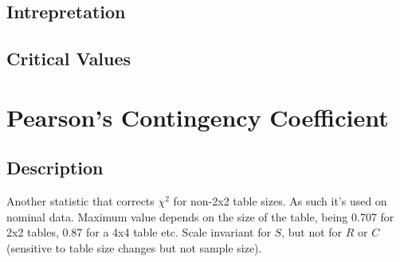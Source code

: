\documentclass[11pt]{article}
\begin{document}
\subsection{Intrepretation}

\subsection{Critical Values}















\section{Pearson's Contingency Coefficient}
\label{section:contingencycoefficient}
\subsection{Description}
Another statistic that corrects $\chi^2$ for non-2x2 table sizes.  
As such it's used on nominal data.  
Maximum value depends on the size of the table, being 0.707 for 2x2 tables, 0.87 for a 4x4 table etc.  
Scale invariant for $S$, but not for $R$ or $C$ (sensitive to table size changes but not sample size).
\end{document}
